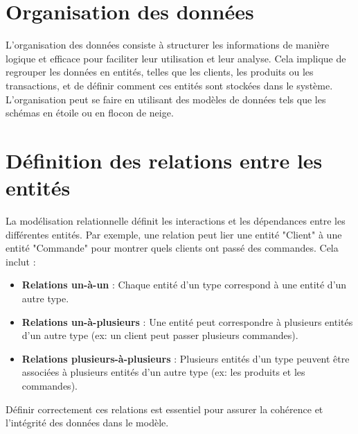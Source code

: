 \documentclass[a4paper,12pt]{report}
\begin{document}
\section{Organisation des données}
L'organisation des données consiste à structurer les informations de manière logique et efficace pour faciliter leur utilisation et leur analyse. Cela implique de regrouper les données en entités, telles que les clients, les produits ou les transactions, et de définir comment ces entités sont stockées dans le système. L'organisation peut se faire en utilisant des modèles de données tels que les schémas en étoile ou en flocon de neige.

\section{Définition des relations entre les entités}
La modélisation relationnelle définit les interactions et les dépendances entre les différentes entités. Par exemple, une relation peut lier une entité "Client" à une entité "Commande" pour montrer quels clients ont passé des commandes. Cela inclut :
\begin{itemize}
    \item \textbf{Relations un-à-un} : Chaque entité d'un type correspond à une entité d'un autre type.
    \item \textbf{Relations un-à-plusieurs} : Une entité peut correspondre à plusieurs entités d'un autre type (ex: un client peut passer plusieurs commandes).
    \item \textbf{Relations plusieurs-à-plusieurs} : Plusieurs entités d'un type peuvent être associées à plusieurs entités d'un autre type (ex: les produits et les commandes).
\end{itemize}
Définir correctement ces relations est essentiel pour assurer la cohérence et l'intégrité des données dans le modèle.
\end{document}

